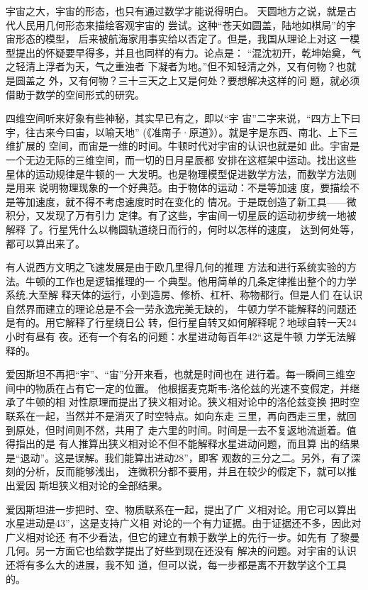 \documentclass[twoside,openright,headings=optiontohead]{ctexbook} %
\begin{document}
{宇宙之大，宇宙的形态，也只有通过数学才能说得明白。
天圆地方之说，就是古代人民用几何形态来描绘客观宇宙的
尝试。这种``苍天如圆盖，陆地如棋局''的宇宙形态的模型，
后来被航海家用事实给以否定了。但是，我国从理论上对这
一模型提出的怀疑要早得多，并且也同样的有力。论点是：
``混沈初开，乾坤始奠，气之轻清上浮者为天，气之重浊者
下凝者为地。''但不知轻清之外，又有何物？也就是圆盖之
外，又有何物？三十三天之上又是何处？要想解决这样的问
题，就必须借助于数学的空间形式的研究。

四维空间听来好象有些神秘，其实早已有之，即以``宇
宙''二字来说，``四方上下曰宇，往古来今曰宙，以喻天地''
(《准南子·原道》）。就是宇是东西、南北、上下三维扩展的
空间，而宙是一维的时间。牛顿时代对宇宙的认识也就是如
此。宇宙是一个无边无际的三维空间，而一切的日月星辰都
安排在这框架中运动。找出这些星体的运动规律是牛顿的一
大发明。也是物理模型促进数学方法，而数学方法则是用来
说明物理现象的一个好典范。由于物体的运动：不是等加速
度，要描绘不是等加速度，就不得不考虑速度时时在变化的
情况。于是既创造了新工具------微积分，又发现了万有引力
定律。有了这些，宇宙间一切星辰的运动初步统一地被解释
了。行星凭什么以椭圆轨道绕日而行的，何时以怎样的速度，
达到何处等，都可以算出来了。

有人说西方文明之飞速发展是由于欧几里得几何的推理
方法和进行系统实验的方法。牛顿的工作也是逻辑推理的一
个典型。他用简单的几条定律推出整个的力学系统.大至解
释天体的运行，小到造房、修桥、杠杆、称物都行。但是人们
在认识自然界而建立的理论总是不会一劳永逸完美无缺的，
牛顿力学不能解释的问题还是有的。用它解释了行星绕日公
转，但行星自转又如何解释呢？地球自转一天24小时有昼有
夜。还有一个有名的问题：水星进动每百年42``.这是牛顿 力学无法解释的。

爱因斯坦不再把``宇''、``宙''分开来看，也就是时间也在
进行着。每一瞬间三维空间中的物质在占有它一定的位置。
他根据麦克斯韦-洛伦兹的光速不变假定，并继承了牛顿的相
对性原理而提出了狭义相对论。狭义相对论中的洛伦兹变换
把时空联系在一起，当然并不是消灭了时空特点。如向东走
三里，再向西走三里，就回到原处，但时间则不然，共用了
走六里的时间。时间是一去不复返地流逝着。值得指出的是
有人推算出狭义相对论不但不能解释水星进动问题，而且算
出的结果是``退动''。这是误解。我们能算出进动28''，即客
观数的三分之二。另外，有了深刻的分析，反而能够浅出，
连微积分都不要用，并且在较少的假定下，就可以推出爱因
斯坦狭义相对论的全部结果。

爱因斯坦进一步把时、空、物质联系在一起，提出了广
义相对论。用它可以算出水星进动是43''，这是支持广义相
对论的一个有力证据。由于证据还不多，因此对广义相对论还
有不少看法，但它的建立有赖于数学上的先行一步。如先有
了黎曼几何。另一方面它也给数学提出了好些到现在还没有
解决的问题。对宇宙的认识还将有多么大的进展，我不知
道，但可以说，每一步都是离不开数学这个工具的。

}
\end{document}
